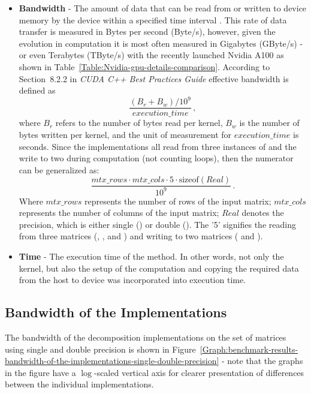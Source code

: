 \begin{itemize}
	\item \textbf{Bandwidth} - The amount of data that can be read from or written to device memory by the device within a specified time interval \cite{F4RUu4doMdeEMKXX}. This rate of data transfer is measured in Bytes per second (Byte/s), however, given the evolution in computation it is most often measured in Gigabytes (GByte/s) - or even Terabytes (TByte/s) with the recently launched Nvidia A100 as shown in Table~\ref{Table:Nvidia-gpu-details-comparison}. According to Section~8.2.2 in \emph{CUDA C++ Best Practices Guide} \cite{F4RUu4doMdeEMKXX} effective bandwidth is defined as
		\begin{equation}
			\frac{\left(B_r + B_w\right)/10^9}{execution\_time} \nonumber\,,
		\end{equation}
	where $ B_r $ refers to the number of bytes read per kernel, $ B_w $ is the number of bytes written per kernel, and the unit of measurement for $ execution\_time $ is seconds. Since the implementations all read from three instances of  and the write to two during computation (not counting loops), then the numerator can be generalized as:
		\begin{equation}
			\frac{mtx\_rows \cdot mtx\_cols \cdot 5 \cdot \mathrm{sizeof} \left(Real\right)}{10^9} \nonumber\,.
		\end{equation}
	Where $ mtx\_rows $ represents the number of rows of the input matrix; $ mtx\_cols $ represents the number of columns of the input matrix; $ Real $ denotes the precision, which is either single () or double (). The '5' signifies the reading from three matrices (, , and ) and writing to two matrices ( and ).
	\item \textbf{Time} - The execution time of the  method. In other words, not only the kernel, but also the setup of the computation and copying the required data from the host to device was incorporated into execution time.
\end{itemize}

\subsection{Bandwidth of the Implementations \TO}\label{Subsection:benchmark-results-bandwidth-of-the-implementations}
The bandwidth of the decomposition implementations on the set of matrices using single and double precision is shown in Figure~\ref{Graph:benchmark-results-bandwidth-of-the-implementations-single-double-precision} - note that the graphs in the figure have a $ \log $-scaled vertical axis for clearer presentation of differences between the individual implementations.

